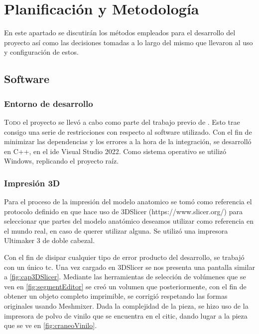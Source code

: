 \chapter{Planificación y Metodología}
\label{chap:metodos}
En este apartado se discutirán los métodos empleados para el desarrollo del proyecto así como las decisiones tomadas a lo largo del mismo que llevaron al uso y configuración de estos.


\section{Software}
\subsection{Entorno de desarrollo}
\lettrine{T}{odo} el proyecto se llevó a cabo como parte del trabajo previo de \citeauthor{IglesiasGuitian2022}. Esto trae consigo una serie de restricciones con respecto al software utilizado. Con el fin de minimizar las dependencias y los errores a la hora de la integración, se desarrolló en C++, en el \acrshort{ide} Visual Studio 2022. Como sistema operativo se utilizó Windows, replicando el proyecto raíz.
\subsection{Impresión 3D}
Para el proceso de la impresión del modelo anatomico se tomó como referencia el protocolo definido en \citeauthor{MoretaMartinez2020} que hace uso de 3DSlicer (https://www.slicer.org/) para seleccionar que partes del modelo anatómico deseamos utilizar como referencia en el mundo real, en caso de querer utilizar alguna. Se utilizó una impresora Ultimaker 3 de doble cabezal.

Con el fin de disipar cualquier tipo de error producto del desarrollo, se trabajó con un único \acrshort{tc}. Una vez cargado en 3DSlicer se nos presenta una pantalla similar a \ref{fig:cap3DSlicer}. 
Mediante las herramientas de selección de volúmenes que se ven en \ref{fig:segmentEditor} se creó un volumen que posteriormente, con el fin de obtener un objeto completo imprimible, se corrigió respetando las formas originales usando Meshmixer.
Dada la complejidad de la pieza, se hizo uso de la impresora de polvo de vinilo que se encuentra en el \acrshort{citic}, dando lugar a la pieza que se ve en \ref{fig:craneoVinilo}.




